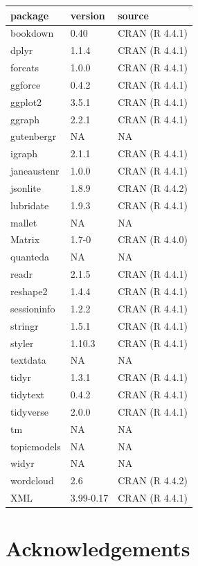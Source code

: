 \documentclass[
]{book}
\begin{document}
\begin{longtable}[]{@{}lll@{}}
\toprule\noalign{}
package & version & source \\
\midrule\noalign{}
\endhead
\bottomrule\noalign{}
\endlastfoot
bookdown & 0.40 & CRAN (R 4.4.1) \\
dplyr & 1.1.4 & CRAN (R 4.4.1) \\
forcats & 1.0.0 & CRAN (R 4.4.1) \\
ggforce & 0.4.2 & CRAN (R 4.4.1) \\
ggplot2 & 3.5.1 & CRAN (R 4.4.1) \\
ggraph & 2.2.1 & CRAN (R 4.4.1) \\
gutenbergr & NA & NA \\
igraph & 2.1.1 & CRAN (R 4.4.1) \\
janeaustenr & 1.0.0 & CRAN (R 4.4.1) \\
jsonlite & 1.8.9 & CRAN (R 4.4.2) \\
lubridate & 1.9.3 & CRAN (R 4.4.1) \\
mallet & NA & NA \\
Matrix & 1.7-0 & CRAN (R 4.4.0) \\
quanteda & NA & NA \\
readr & 2.1.5 & CRAN (R 4.4.1) \\
reshape2 & 1.4.4 & CRAN (R 4.4.1) \\
sessioninfo & 1.2.2 & CRAN (R 4.4.1) \\
stringr & 1.5.1 & CRAN (R 4.4.1) \\
styler & 1.10.3 & CRAN (R 4.4.1) \\
textdata & NA & NA \\
tidyr & 1.3.1 & CRAN (R 4.4.1) \\
tidytext & 0.4.2 & CRAN (R 4.4.1) \\
tidyverse & 2.0.0 & CRAN (R 4.4.1) \\
tm & NA & NA \\
topicmodels & NA & NA \\
widyr & NA & NA \\
wordcloud & 2.6 & CRAN (R 4.4.2) \\
XML & 3.99-0.17 & CRAN (R 4.4.1) \\
\end{longtable}

\section*{Acknowledgements}\label{acknowledgements}
\end{document}
